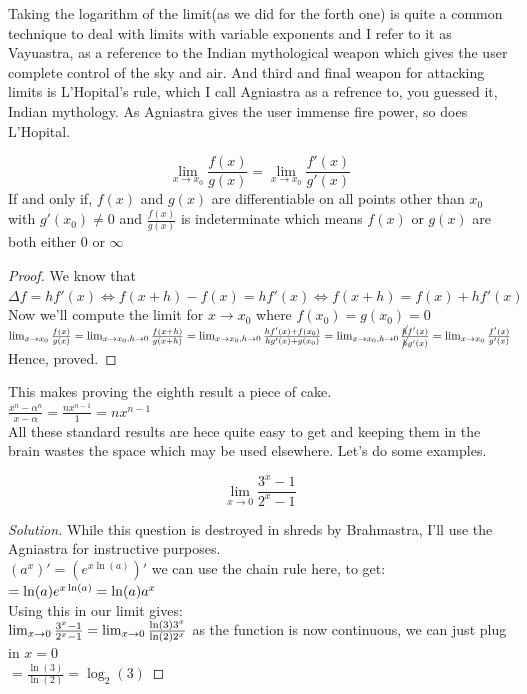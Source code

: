 Taking the logarithm of the limit(as we did for the forth one) is quite a common technique to deal with limits with variable exponents and I refer to it as Vayuastra, as a reference to the Indian mythological weapon which gives the user complete control of the sky and air.
And third and final weapon for attacking limits is L'Hopital's rule, which I call Agniastra as a refrence to, you guessed it, Indian mythology. As Agniastra gives the user immense fire power, so does L'Hopital.\\
  \begin{theorem}
      \[\lim_{x \to x_0} \frac{f(x)}{g(x)}= \lim_{x \to x_0} \frac{f'(x)}{g'(x)}\]
      If and only if, $f(x)$ and $g(x)$ are differentiable on all points other than $x_0$ with $g'(x_0)\neq0$ and $\frac{f(x)}{g(x)}$ is indeterminate which means $f(x)$ or $g(x)$ are both either $0$ or $\infty$ 
  \end{theorem}
  \begin{proof}
      We know that $\Delta f=hf'(x) \iff f(x+h)-f(x)=hf'(x) \iff f(x+h)=f(x)+hf'(x)$\\
      Now we'll compute the limit for $x \to x_0$ where $f(x_0)=g(x_0)=0$\\
      $\lim_{x \to x_0} \frac{f(x)}{g(x)}\\
      = \lim_{x \to x_0, h \to 0} \frac{f(x+h)}{g(x+h)}\\
      = \lim_{x \to x_0, h \to 0} \frac{hf'(x)+f(x_0)}{hg'(x)+g(x_0)}\\
      = \lim_{x \to x_0, h \to 0} \frac{\cancel{h}f'(x)}{\cancel{h}g'(x)}\\
      =\lim_{x \to x_0} \frac{f'(x)}{g'(x)}$\\
      Hence, proved.
  \end{proof}
This makes proving the eighth result a piece of cake.\\
$\frac{x^n-\alpha^n}{x-\alpha}=\frac{nx^{n-1}}{1}=nx^{n-1}$\\
All these standard results are hece quite easy to get and keeping them in the brain wastes the space which may be used elsewhere. Let's do some examples.\\
\begin{example}
    \[\lim_{x \to 0}\frac{3^x-1}{2^x-1}\]
\end{example}
\begin{proof}
[Solution]
    While this question is destroyed in shreds by Brahmastra, I'll use the Agniastra for instructive purposes.\\
    $(a^x)'=(e^{x\ln(a)})'$ we can use the chain rule here, to get:\\
    $=\ln(a)e^{x\ln(a)}\\
    = \ln(a)a^x$\\
    Using this in our limit gives:\\
    $\lim_{x \to 0}\frac{3^x-1}{2^x-1}\\
    = \lim_{x \to 0}\frac{\ln(3)3^x}{\ln(2)2^x}$ as the function is now continuous, we can just plug in $x=0$\\
    $=\frac{\ln(3)}{\ln(2)}
    =\log_2(3)$
\end{proof}
